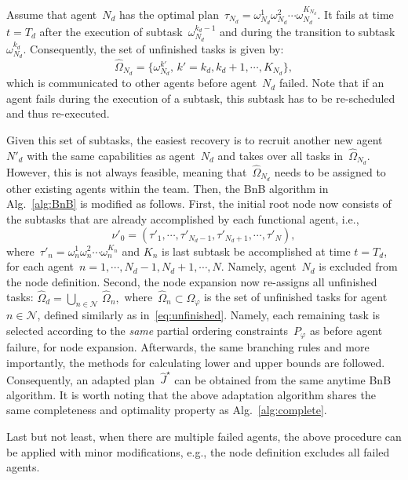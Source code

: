 Assume that agent~$N_d$ has the optimal
plan~$\tau_{N_d}=\omega^1_{N_d}\omega^2_{N_d}\cdots \omega^{K_{N_d}}_{N_d}$.
It fails at time $t=T_d$ after the execution of subtask~$\omega^{k_d-1}_{N_d}$ and during the
transition to subtask~$\omega^{k_d}_{N_d}$.
Consequently, the set of unfinished tasks is given by:
\begin{equation}\label{eq:unfinished}
\widehat{\Omega}_{N_d}=\{\omega^{k'}_{N_d},\,k'=k_d,k_d+1,\cdots,K_{N_d}\},
\end{equation}
which is communicated to other agents before agent~$N_d$ failed.
Note that if an agent fails during the execution of a subtask,
this subtask has to be re-scheduled and thus re-executed.



Given this set of subtasks, the easiest recovery is to recruit another new
agent~$N'_d$ with the same capabilities as agent~$N_d$ and
takes over all tasks in~$\widehat{\Omega}_{N_d}$.
However, this is not always feasible, meaning that~$\widehat{\Omega}_{N_d}$ needs to
be assigned to other existing agents within the team.
Then, the BnB algorithm in Alg.~\ref{alg:BnB} is modified as follows.
First, the initial root node now consists of the subtasks that are already
accomplished by each functional agent, i.e.,
\begin{equation}\label{eq:new-initial}
  \nu'_0=(\tau'_1,\cdots,\tau'_{N_d-1},\tau'_{N_d+1},\cdots,\tau'_{N}),
\end{equation}
where~$\tau'_n=\omega^1_n \omega^2_n\cdots \omega^{K_n}_n$ and $K_n$ is last
subtask be accomplished at time $t=T_d$,
for each agent~$n=1,\cdots,N_d-1,N_d+1,\cdots,N$.
Namely, agent~$N_d$ is excluded from the node definition.
Second, the node expansion now re-assigns all unfinished tasks:
$
  \widehat{\Omega}_d= \bigcup_{n\in \mathcal{N}}\,\widehat{\Omega}_n,
$
where~$\widehat{\Omega}_n\subset \Omega_{\varphi}$ is the set of unfinished tasks
for agent~$n\in \mathcal{N}$, defined similarly as in~\eqref{eq:unfinished}.
Namely, each remaining task is selected according to the \emph{same} partial
ordering constraints~$P_{\varphi}$ as before agent failure, for node expansion.
Afterwards, the same branching rules and more importantly,
the methods for calculating lower and upper bounds are followed.
Consequently, an adapted plan~$\widehat{J}^\star$ can be obtained
from the same anytime BnB algorithm.
It is worth noting that the above adaptation algorithm shares the same
completeness and optimality property as Alg.~\ref{alg:complete}.

Last but not least, when there are multiple failed agents, the above procedure
can be applied with minor modifications, e.g., the node definition excludes
all failed agents.
